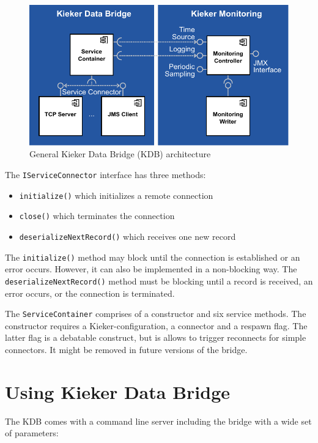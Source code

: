 \documentclass[11pt,a4paper]{article}
\begin{document}
\begin{figure}[htb]
\includegraphics[width=\textwidth]{images/kieker-data-bridge.pdf}
\caption{General Kieker Data Bridge (KDB) architecture}
\label{fig:kdb-arch}
\end{figure}

The \texttt{IServiceConnector} interface has three methods:

\begin{itemize}
\item \texttt{initialize()} which initializes a remote connection
\item \texttt{close()} which terminates the connection
\item \texttt{deserializeNextRecord()} which receives one new record
\end{itemize}

\noindent
The \texttt{initialize()} method may block until the connection is established or an error occurs. However, it can also be implemented in a non-blocking way. The \texttt{deserializeNextRecord()} method must be blocking until a record is received, an error occurs, or the connection is terminated.

The \texttt{ServiceContainer} comprises of a constructor and six service methods. The constructor requires a Kieker-configuration, a connector and a respawn flag. The latter flag is a debatable construct, but is allows to trigger reconnects for simple connectors. It might be removed in future versions of the bridge.

\section{Using Kieker Data Bridge}\label{s:using-kdb}

The KDB comes with a command line server including the bridge with a wide set of parameters:
\end{document}
